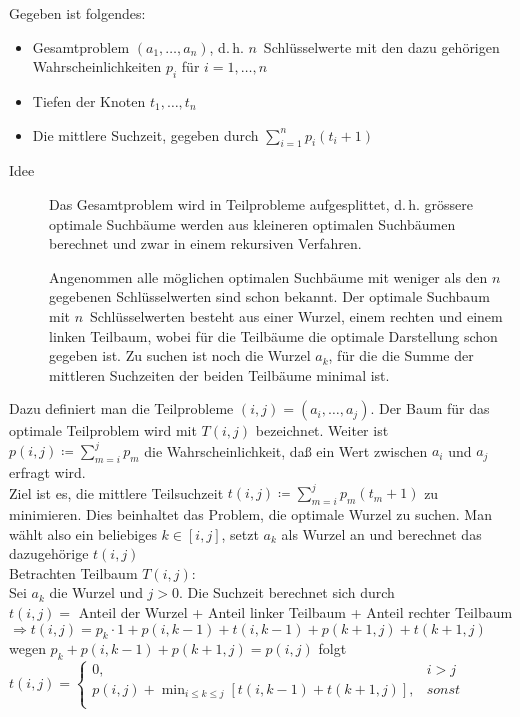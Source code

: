 \documentclass[ngerman,draft,parskip=half*,twoside]{scrreprt}
\theoremstyle{break}
\theoremstyle{nonumberbreak}
\begin{document}
Gegeben ist folgendes:
\begin{itemize}
    \item Gesamtproblem $(a_1, \dots,a_n)$, d.\,h. $n$~Schlüsselwerte mit den dazu gehörigen Wahrscheinlichkeiten $p_i$ für $i=1, \dotsc, n$
    \item Tiefen der Knoten $t_1,\dots,t_n$
    \item Die mittlere Suchzeit, gegeben durch $\sum_{i=1}^n p_i(t_i+1)$
\end{itemize}
\begin{description}
    \item[Idee] Das Gesamtproblem wird in Teilprobleme aufgesplittet, d.\,h. grössere optimale Suchbäume werden
     aus kleineren optimalen Suchbäumen  berechnet und zwar in einem rekursiven Verfahren.
     
     Angenommen alle möglichen optimalen Suchbäume mit weniger als den $n$ gegebenen Schlüsselwerten sind schon bekannt.
     Der optimale Suchbaum mit $n$~Schlüsselwerten besteht aus einer Wurzel, einem rechten und einem linken Teilbaum, wobei
     für die Teilbäume die optimale Darstellung schon gegeben ist. Zu suchen ist noch die Wurzel $a_k$, für die die
     Summe der mittleren Suchzeiten der beiden Teilbäume minimal ist.
\end{description}
Dazu definiert man die Teilprobleme $(i,j)=(a_i,\dots,a_j)$. Der Baum für das optimale Teilproblem wird mit $T(i,j)$
bezeichnet. Weiter ist $p(i,j)\coloneqq \sum_{m=i}^j p_m$ die Wahrscheinlichkeit, daß ein Wert zwischen $a_i$ und $a_j$
erfragt wird.\\ Ziel ist es, die mittlere Teilsuchzeit $t(i,j)\coloneqq \sum_{m=i}^j p_m(t_m+1)$ zu minimieren. Dies beinhaltet
das Problem, die optimale Wurzel zu suchen. Man wählt also ein beliebiges $k\in [i,j]$, setzt $a_k$ als Wurzel
an und berechnet das dazugehörige $t(i,j)$ \\
Betrachten Teilbaum $T(i,j)$:\\ Sei $a_k$ die Wurzel und $j>0$. Die Suchzeit berechnet sich durch\\
$t(i,j)=$ Anteil der Wurzel + Anteil linker Teilbaum + Anteil rechter Teilbaum
$\Rightarrow t(i,j)=p_k\cdot 1+p(i,k-1)+t(i,k-1)+p(k+1,j)+t(k+1,j)$
wegen $p_k+p(i,k-1)+p(k+1,j)=p(i,j)$ folgt
$t(i,j)=\left\{\begin{array}{ll}
    0, & i>j \\
    p(i,j)+ \min_{i\leq k\leq j}[t(i,k-1)+t(k+1,j)], & sonst \\ \end{array}\right.    $
\end{document}
